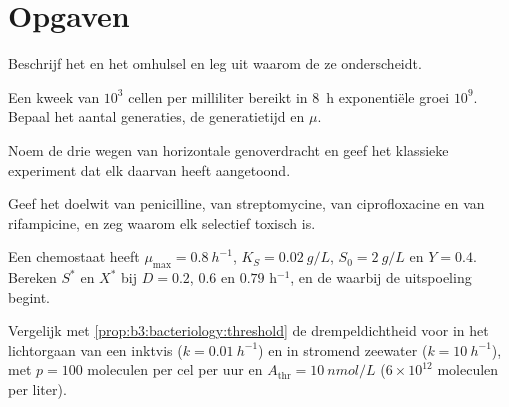 \section{Opgaven}

\begin{exercise}[$\star$]\label{exo:b3:bacteriology:1}
Beschrijf het  en het  omhulsel en leg uit
waarom de  ze onderscheidt.
\end{exercise}

\begin{exercise}[$\star$]\label{exo:b3:bacteriology:2}
Een kweek van $10^{3}$ cellen per milliliter bereikt in \qty{8}{h}
exponentiële groei $10^{9}$. Bepaal het aantal generaties, de
generatietijd en $\mu$.
\end{exercise}

\begin{exercise}[$\star$]\label{exo:b3:bacteriology:3}
Noem de drie wegen van horizontale genoverdracht en geef het klassieke
experiment dat elk daarvan heeft aangetoond.
\end{exercise}

\begin{exercise}[$\star$]\label{exo:b3:bacteriology:4}
Geef het doelwit van penicilline, van streptomycine, van ciprofloxacine
en van rifampicine, en zeg waarom elk selectief toxisch is.
\end{exercise}

\begin{exercise}[$\star\star$]\label{exo:b3:bacteriology:5}
Een chemostaat heeft $\mu_{\max} = \qty{0.8}{h^{-1}}$, $K_{S} =
\qty{0.02}{g/L}$, $S_{0} = \qty{2}{g/L}$ en $Y = 0.4$. Bereken $S^{*}$
en $X^{*}$ bij $D = 0.2$, $0.6$ en $0.79$ h$^{-1}$, en de
 waarbij de uitspoeling begint.
\end{exercise}

\begin{exercise}[$\star\star$]\label{exo:b3:bacteriology:6}
Vergelijk met \cref{prop:b3:bacteriology:threshold} de drempeldichtheid
voor  in het lichtorgaan van een inktvis ($k =
\qty{0.01}{h^{-1}}$) en in stromend zeewater ($k = \qty{10}{h^{-1}}$),
met $p = 100$ moleculen per cel per uur en $A_{\text{thr}} =
\qty{10}{nmol/L}$ ($6\times 10^{12}$ moleculen per liter).
\end{exercise}

